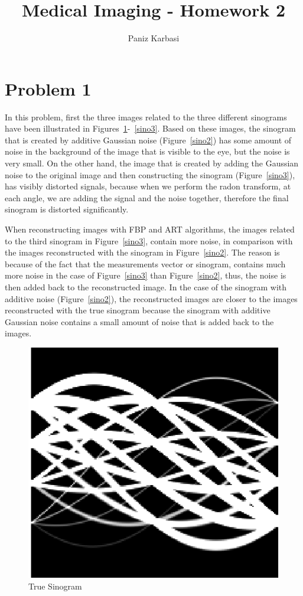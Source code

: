 \documentclass{article}
\begin{document}
\title{Medical Imaging - Homework 2}
\author{Paniz Karbasi}

\maketitle

\section{Problem 1}

In this problem, first the three images related to the three different sinograms have been illustrated in Figures~\ref{sino1}-~\ref{sino3}. Based on these images, the sinogram that is created by additive Gaussian noise (Figure~\ref{sino2}) has some amount of noise in the background of the image that is visible to the eye, but the noise is very small. On the other hand, the image that is created by adding the Gaussian noise to the original image and then constructing the sinogram (Figure~\ref{sino3}), has visibly distorted signals, because when we perform the radon transform, at each angle, we are adding the signal and the noise together, therefore the final sinogram is distorted significantly.



When reconstructing images with FBP and ART algorithms, the images related to the third sinogram in Figure~\ref{sino3}, contain more noise, in comparison with the images reconstructed with the sinogram in Figure~\ref{sino2}. The reason is because of the fact that the measurements vector or sinogram, contains much more noise in the case of Figure~\ref{sino3} than Figure~\ref{sino2}, thus, the noise is then added back to the reconstructed image. In the case of the sinogram with additive noise (Figure~\ref{sino2}), the reconstructed images are closer to the images reconstructed with the true sinogram because the sinogram with additive Gaussian noise contains a small amount of noise that is added back to the images.


\newpage
\begin{figure}[h]
\centering
  \includegraphics{sino1.png}
  \caption{True Sinogram}\label{sino1}
\end{figure}
\end{document}
